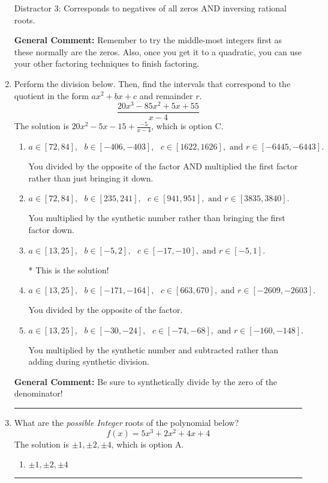 \documentclass{extbook}[14pt]
\newcommand{\litem}[1]{\item #1

\rule{\textwidth}{0.4pt}}
\begin{document}
\begin{enumerate}
{\begin{enumerate}[label=\Alph*.]
 Distractor 3: Corresponds to negatives of all zeros AND inversing rational roots.
\end{enumerate}

\textbf{General Comment:} Remember to try the middle-most integers first as these normally are the zeros. Also, once you get it to a quadratic, you can use your other factoring techniques to finish factoring.
}
\litem{
Perform the division below. Then, find the intervals that correspond to the quotient in the form $ax^2+bx+c$ and remainder $r$.
\[ \frac{20x^{3} -85 x^{2} +5 x + 55}{x -4} \]The solution is \( 20x^{2} -5 x -15 + \frac{-5}{x -4} \), which is option C.\begin{enumerate}[label=\Alph*.]
\item \( a \in [72, 84], \text{   } b \in [-406, -403], \text{   } c \in [1622, 1626], \text{   and   } r \in [-6445, -6443]. \)

 You divided by the opposite of the factor AND multiplied the first factor rather than just bringing it down.
\item \( a \in [72, 84], \text{   } b \in [235, 241], \text{   } c \in [941, 951], \text{   and   } r \in [3835, 3840]. \)

 You multiplied by the synthetic number rather than bringing the first factor down.
\item \( a \in [13, 25], \text{   } b \in [-5, 2], \text{   } c \in [-17, -10], \text{   and   } r \in [-5, 1]. \)

* This is the solution!
\item \( a \in [13, 25], \text{   } b \in [-171, -164], \text{   } c \in [663, 670], \text{   and   } r \in [-2609, -2603]. \)

 You divided by the opposite of the factor.
\item \( a \in [13, 25], \text{   } b \in [-30, -24], \text{   } c \in [-74, -68], \text{   and   } r \in [-160, -148]. \)

 You multiplied by the synthetic number and subtracted rather than adding during synthetic division.
\end{enumerate}

\textbf{General Comment:} Be sure to synthetically divide by the zero of the denominator!
}
\litem{
What are the \textit{possible Integer} roots of the polynomial below?
\[ f(x) = 5x^{3} +2 x^{2} +4 x + 4 \]The solution is \( \pm 1,\pm 2,\pm 4 \), which is option A.\begin{enumerate}[label=\Alph*.]
\item \( \pm 1,\pm 2,\pm 4 \)


\end{enumerate}}
\end{enumerate}
\end{document}
